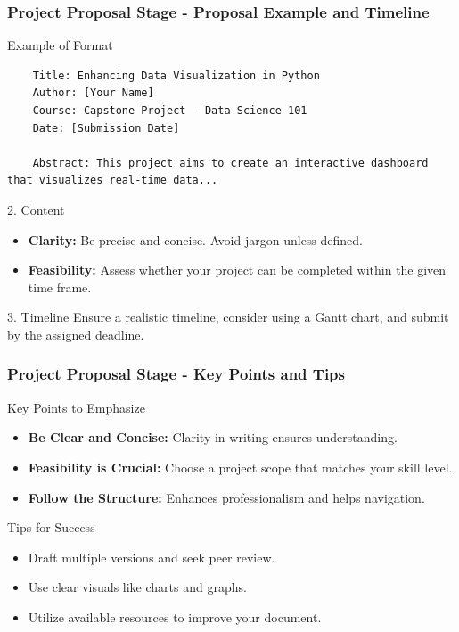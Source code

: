 \documentclass{beamer}
\begin{document}
\begin{frame}[fragile]
    \frametitle{Project Proposal Stage - Proposal Example and Timeline}
    \begin{block}{Example of Format}
    \begin{verbatim}
    Title: Enhancing Data Visualization in Python
    Author: [Your Name]
    Course: Capstone Project - Data Science 101
    Date: [Submission Date]

    Abstract: This project aims to create an interactive dashboard that visualizes real-time data...
    \end{verbatim}
    \end{block}

    \begin{block}{2. Content}
        \begin{itemize}
            \item \textbf{Clarity:} Be precise and concise. Avoid jargon unless defined.
            \item \textbf{Feasibility:} Assess whether your project can be completed within the given time frame.
        \end{itemize}
    \end{block}
    
    \begin{block}{3. Timeline}
        Ensure a realistic timeline, consider using a Gantt chart, and submit by the assigned deadline.
    \end{block}
\end{frame}

\begin{frame}[fragile]
    \frametitle{Project Proposal Stage - Key Points and Tips}
    \begin{block}{Key Points to Emphasize}
        \begin{itemize}
            \item \textbf{Be Clear and Concise:} Clarity in writing ensures understanding.
            \item \textbf{Feasibility is Crucial:} Choose a project scope that matches your skill level.
            \item \textbf{Follow the Structure:} Enhances professionalism and helps navigation.
        \end{itemize}
    \end{block}

    \begin{block}{Tips for Success}
        \begin{itemize}
            \item Draft multiple versions and seek peer review.
            \item Use clear visuals like charts and graphs.
            \item Utilize available resources to improve your document.
        \end{itemize}
    \end{block}
\end{frame}
\end{document}
